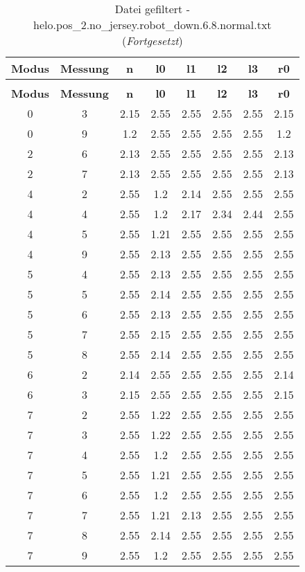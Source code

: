 \begin{longtable}{|c|c||c||c|c|c|c||c|}
	\caption{Datei gefiltert - helo.pos\_2.no\_jersey.robot\_down.6.8.normal.txt} \label{tab:helo.pos-2.no-jersey.robot-down.6.8.normal.txt} \\ \hline
	\textbf{Modus} & \textbf{Messung} & \textbf{n} & \textbf{l0} & \textbf{l1} & \textbf{l2} & \textbf{l3} & \textbf{r0}\\ \hline
	\endfirsthead
	\caption[]{Datei gefiltert - helo.pos\_2.no\_jersey.robot\_down.6.8.normal.txt (\emph{Fortgesetzt})} \\ \hline
	\textbf{Modus} & \textbf{Messung} & \textbf{n} & \textbf{l0} & \textbf{l1} & \textbf{l2} & \textbf{l3} & \textbf{r0}\\ \hline
	\endhead
	0 & 3 & 2.15 & 2.55 & 2.55 & 2.55 & 2.55 & 2.15 \\ \hline
	0 & 9 & 1.2 & 2.55 & 2.55 & 2.55 & 2.55 & 1.2 \\ \hline
	2 & 6 & 2.13 & 2.55 & 2.55 & 2.55 & 2.55 & 2.13 \\ \hline
	2 & 7 & 2.13 & 2.55 & 2.55 & 2.55 & 2.55 & 2.13 \\ \hline
	4 & 2 & 2.55 & 1.2 & 2.14 & 2.55 & 2.55 & 2.55 \\ \hline
	4 & 4 & 2.55 & 1.2 & 2.17 & 2.34 & 2.44 & 2.55 \\ \hline
	4 & 5 & 2.55 & 1.21 & 2.55 & 2.55 & 2.55 & 2.55 \\ \hline
	4 & 9 & 2.55 & 2.13 & 2.55 & 2.55 & 2.55 & 2.55 \\ \hline
	5 & 4 & 2.55 & 2.13 & 2.55 & 2.55 & 2.55 & 2.55 \\ \hline
	5 & 5 & 2.55 & 2.14 & 2.55 & 2.55 & 2.55 & 2.55 \\ \hline
	5 & 6 & 2.55 & 2.13 & 2.55 & 2.55 & 2.55 & 2.55 \\ \hline
	5 & 7 & 2.55 & 2.15 & 2.55 & 2.55 & 2.55 & 2.55 \\ \hline
	5 & 8 & 2.55 & 2.14 & 2.55 & 2.55 & 2.55 & 2.55 \\ \hline
	6 & 2 & 2.14 & 2.55 & 2.55 & 2.55 & 2.55 & 2.14 \\ \hline
	6 & 3 & 2.15 & 2.55 & 2.55 & 2.55 & 2.55 & 2.15 \\ \hline
	7 & 2 & 2.55 & 1.22 & 2.55 & 2.55 & 2.55 & 2.55 \\ \hline
	7 & 3 & 2.55 & 1.22 & 2.55 & 2.55 & 2.55 & 2.55 \\ \hline
	7 & 4 & 2.55 & 1.2 & 2.55 & 2.55 & 2.55 & 2.55 \\ \hline
	7 & 5 & 2.55 & 1.21 & 2.55 & 2.55 & 2.55 & 2.55 \\ \hline
	7 & 6 & 2.55 & 1.2 & 2.55 & 2.55 & 2.55 & 2.55 \\ \hline
	7 & 7 & 2.55 & 1.21 & 2.13 & 2.55 & 2.55 & 2.55 \\ \hline
	7 & 8 & 2.55 & 2.14 & 2.55 & 2.55 & 2.55 & 2.55 \\ \hline
	7 & 9 & 2.55 & 1.2 & 2.55 & 2.55 & 2.55 & 2.55 \\ \hline
\end{longtable}
